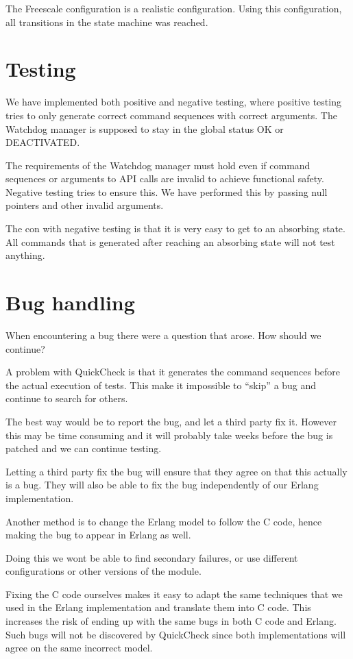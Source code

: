 \documentclass[a4paper]{article}
\begin{document}
The Freescale configuration is a realistic configuration.
Using this configuration, all transitions in the state machine was reached.

\section{Testing}
We have implemented both positive and negative testing, where positive
testing tries to only generate correct command sequences with correct
arguments. The Watchdog manager is supposed to stay in the global
status OK or DEACTIVATED.

The requirements of the Watchdog manager must hold even if command
sequences or arguments to API calls are invalid to achieve functional
safety. Negative testing tries to ensure this. We have performed this
by passing null pointers and other invalid arguments.

The con with negative testing is that it is very easy to get to an
absorbing state. All commands that is generated after reaching an
absorbing state will not test anything.

\section{Bug handling}
When encountering a bug there were a question that arose. How should
we continue?

A problem with QuickCheck is that it generates the command sequences
before the actual execution of tests. This make it impossible to
``skip'' a bug and continue to search for others.

The best way would be to report the bug, and let a third party fix
it. However this may be time consuming and it will probably take weeks
before the bug is patched and we can continue testing.

Letting a third party fix the bug will ensure that they agree on that
this actually is a bug. They will also be able to fix the bug
independently of our Erlang implementation.

Another method is to change the Erlang model to follow the C code,
hence making the bug to appear in Erlang as well.

Doing this we wont be able to find secondary failures, or use
different configurations or other versions of the module.

Fixing the C code ourselves makes it easy to adapt the same techniques
that we used in the Erlang implementation and translate them into C
code.
This increases the risk of ending up with the same bugs in both C code
and Erlang. Such bugs will not be discovered by QuickCheck since both
implementations will agree on the same incorrect model.
\end{document}
